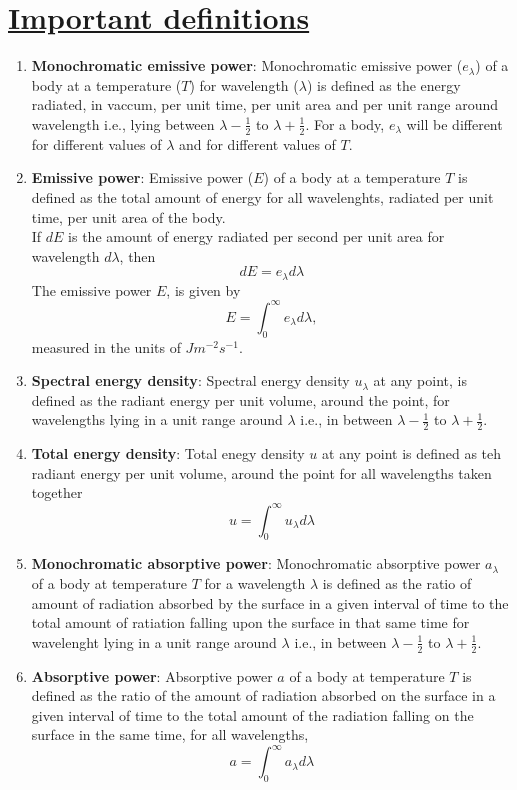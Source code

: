 \documentclass[12pt,a4paper]{article}
\begin{document}
\section{\underline{Important definitions }}
\begin{enumerate}
	\item \textbf{Monochromatic emissive power}: Monochromatic emissive power ($e_{\lambda}$) of a body at a temperature ($T$) for wavelength ($\lambda$) is defined as the energy radiated, in vaccum, per unit time, per unit area and per unit range around wavelength i.e., lying between $\lambda-\frac{1}{2}$ to $\lambda+\frac{1}{2}$. For a body, $e_{\lambda}$ will be different for different values of $\lambda$ and for different values of $T$.
	\item \textbf{Emissive power}: Emissive power ($E$) of a body at a temperature $T$ is defined as the total amount of energy for all wavelenghts, radiated per unit time, per unit area of the body.
	\\
	If $dE$ is the amount of energy radiated per second per unit area for wavelength $d\lambda$, then
	\begin{equation}
		dE = e_{\lambda}d\lambda
	\end{equation}
	The emissive power $E$, is given by
	\begin{equation}
		E = \int_{0}^{\infty} e_{\lambda}d\lambda,
	\end{equation}
	measured in the units of $Jm^{-2}s^{-1}$.
	
	\item \textbf{Spectral energy density}: Spectral energy density $u_{\lambda}$ at any point, is defined as the radiant energy per unit volume, around the point, for wavelengths lying in a unit range around $\lambda$ i.e., in between $\lambda-\frac{1}{2}$ to $\lambda+\frac{1}{2}$.
	\item \textbf{Total energy density}: Total enegy density $u$ at any point is defined as teh radiant energy per unit volume, around the point for all wavelengths taken together
	\begin{equation}
		u = \int_{0}^{\infty} u_{\lambda}d\lambda
	\end{equation}
	
	\item \textbf{Monochromatic absorptive power}: Monochromatic absorptive power $a_{\lambda}$ of a body at temperature $T$ for a wavelength $\lambda$ is defined as the ratio of amount of radiation absorbed by the surface in a given interval of time to the total amount of ratiation falling upon the surface in that same time for wavelenght lying in a unit range around $\lambda$ i.e., in between $\lambda-\frac{1}{2}$ to $\lambda+\frac{1}{2}$.
	\item \textbf{Absorptive power}: Absorptive power $a$ of a body at temperature $T$ is defined as the ratio of the amount of radiation absorbed on the surface in a given interval of time to the total amount of the radiation falling on the surface in the same time, for all wavelengths,
	\begin{equation}
		a = \int_{0}^{\infty}a_{\lambda}d\lambda
	\end{equation}
	
\end{enumerate}
	
\end{document}
